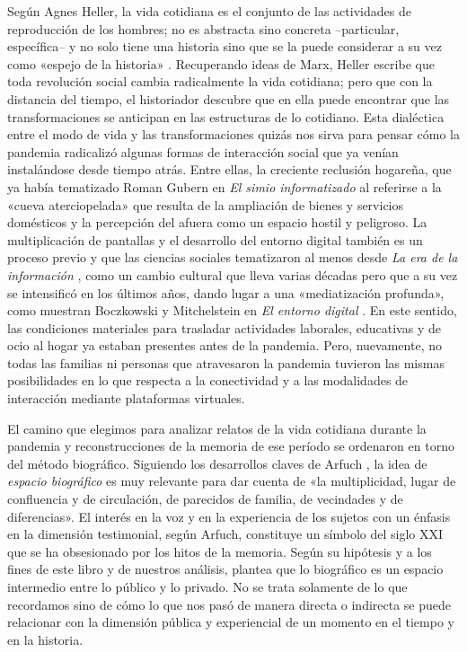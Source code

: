 \begin{refsection}
Según Agnes Heller, la vida cotidiana es el conjunto de las actividades de reproducción de los hombres; no es abstracta sino concreta –particular, específica– y no solo tiene una historia sino que se la puede considerar a su vez como «espejo de la historia» \protect\parencite[pág.~20]{4166-HELLER1977}. Recuperando ideas de Marx, Heller escribe que toda revolución social cambia radicalmente la vida cotidiana; pero que con la distancia del tiempo, el historiador descubre que en ella puede encontrar que las transformaciones se anticipan en las estructuras de lo cotidiano. Esta dialéctica entre el modo de vida y las transformaciones quizás nos sirva para pensar cómo la pandemia radicalizó algunas formas de interacción social que ya venían instalándose desde tiempo atrás. Entre ellas, la creciente reclusión hogareña, que ya había tematizado Roman Gubern en \emph{El simio informatizado} \protect\parencite*{4184-GUBERN1987} al referirse a la «cueva aterciopelada» que resulta de la ampliación de bienes y servicios domésticos y la percepción del afuera como un espacio hostil y peligroso. La multiplicación de pantallas y el desarrollo del entorno digital también es un proceso previo y que las ciencias sociales tematizaron al menos desde \emph{La era de la información} \protect\parencite{4179-CASTELLS1998}, como un cambio cultural que lleva varias décadas pero que a su vez se intensificó en los últimos años, dando lugar a una «mediatización profunda», como muestran Boczkowski y Mitchelstein en \emph{El entorno digital} \protect\parencite*{4187-MITCHELSTEIN2022}. En este sentido, las condiciones materiales para trasladar actividades laborales, educativas y de ocio al hogar ya estaban presentes antes de la pandemia. Pero, nuevamente, no todas las familias ni personas que atravesaron la pandemia tuvieron las mismas posibilidades en lo que respecta a la conectividad y a las modalidades de interacción mediante plataformas virtuales.

El camino que elegimos para analizar relatos de la vida cotidiana durante la pandemia y reconstrucciones de la memoria de ese período se ordenaron en torno del método biográfico. Siguiendo los desarrollos claves de Arfuch \protect\parencite*[pág.~22]{4175-ARFUCH2002}, la idea de \emph{espacio biográfico} es muy relevante para dar cuenta de «la multiplicidad, lugar de confluencia y de circulación, de parecidos de familia, de vecindades y de diferencias». El interés en la voz y en la experiencia de los sujetos con un énfasis en la dimensión testimonial, según Arfuch, constituye un símbolo del siglo XXI que se ha obsesionado por los hitos de la memoria. Según su hipótesis y a los fines de este libro y de nuestros análisis, plantea que lo biográfico es un espacio intermedio entre lo público y lo privado. No se trata solamente de lo que recordamos sino de cómo lo que nos pasó de manera directa o indirecta se puede relacionar con la dimensión pública y experiencial de un momento en el tiempo y en la historia.


\end{refsection}
